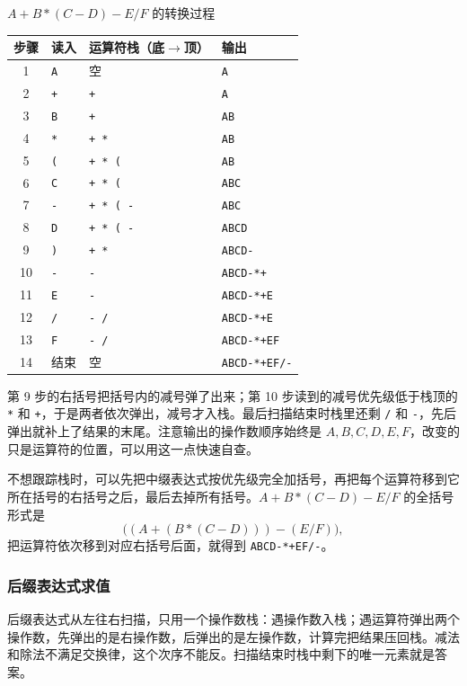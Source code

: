 \begin{tablebox}{$A+B*(C-D)-E/F$ 的转换过程}
\centering\small
\setlength{\tabcolsep}{4pt}
\begin{tabular}{@{}clll@{}}
\toprule
步骤 & 读入 & 运算符栈（底$\to$顶） & 输出 \\
\midrule
1 & \texttt{A} & 空 & \texttt{A} \\
2 & \texttt{+} & \texttt{+} & \texttt{A} \\
3 & \texttt{B} & \texttt{+} & \texttt{AB} \\
4 & \texttt{*} & \texttt{+ *} & \texttt{AB} \\
5 & \texttt{(} & \texttt{+ * (} & \texttt{AB} \\
6 & \texttt{C} & \texttt{+ * (} & \texttt{ABC} \\
7 & \texttt{-} & \texttt{+ * ( -} & \texttt{ABC} \\
8 & \texttt{D} & \texttt{+ * ( -} & \texttt{ABCD} \\
9 & \texttt{)} & \texttt{+ *} & \texttt{ABCD-} \\
10 & \texttt{-} & \texttt{-} & \texttt{ABCD-*+} \\
11 & \texttt{E} & \texttt{-} & \texttt{ABCD-*+E} \\
12 & \texttt{/} & \texttt{- /} & \texttt{ABCD-*+E} \\
13 & \texttt{F} & \texttt{- /} & \texttt{ABCD-*+EF} \\
14 & 结束 & 空 & \texttt{ABCD-*+EF/-} \\
\bottomrule
\end{tabular}
\end{tablebox}

\noindent 第 9 步的右括号把括号内的减号弹了出来；第 10 步读到的减号优先级低于栈顶的 \texttt{*} 和 \texttt{+}，于是两者依次弹出，减号才入栈。最后扫描结束时栈里还剩 \texttt{/} 和 \texttt{-}，先后弹出就补上了结果的末尾。注意输出的操作数顺序始终是 $A,B,C,D,E,F$，改变的只是运算符的位置，可以用这一点快速自查。

不想跟踪栈时，可以先把中缀表达式按优先级完全加括号，再把每个运算符移到它所在括号的右括号之后，最后去掉所有括号。$A+B*(C-D)-E/F$ 的全括号形式是
\[
\bigl((A+(B*(C-D)))-(E/F)\bigr),
\]
把运算符依次移到对应右括号后面，就得到 \texttt{ABCD-*+EF/-}。

\subsubsection*{后缀表达式求值}

后缀表达式从左往右扫描，只用一个操作数栈：遇操作数入栈；遇运算符弹出两个操作数，先弹出的是右操作数，后弹出的是左操作数，计算完把结果压回栈。减法和除法不满足交换律，这个次序不能反。扫描结束时栈中剩下的唯一元素就是答案。


